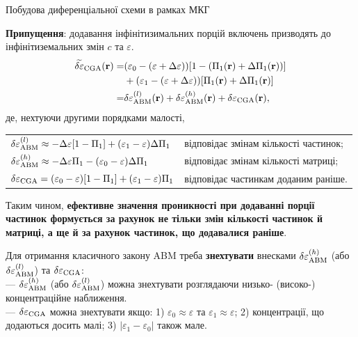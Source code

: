 \documentclass[10pt]{beamer}
\begin{document}
\begin{frame}{Побудова диференціальної схеми в рамках МКГ}
\footnotesize


\textbf{Припущення}: додавання інфінітизимальних порцій включень призводять до інфінітиземальних змін $c$ та $\varepsilon$.
\begin{equation}\label{eq:delta-Brug-diff0}
\begin{split}
  \widetilde{\delta\varepsilon}_{\rm CGA} ({\bf r}) =& (\varepsilon_0 - (\varepsilon + \Delta\varepsilon)) [1 - ({\Pi}_1 ({\bf r}) + \Delta{\Pi}_1 ({\bf r}))]\\
  &+ (\varepsilon_1 - (\varepsilon +   \Delta\varepsilon)) [{\Pi}_1 ({\bf r}) + \Delta{\Pi}_1 ({\bf r})] \\
  =& \delta\varepsilon_{\rm ABM}^{(l)} ({\bf r}) + \delta\varepsilon_{\rm ABM}^{(h)} ({\bf r}) + \delta\varepsilon_{\rm CGA} ({\bf r}),
\end{split}
\end{equation}
де, нехтуючи другими порядками малості,
\begin{tabular}{ ll } 
 $\delta\varepsilon_{\rm ABM}^{(l)} \approx -\Delta\varepsilon [1 - \Pi_1] + (\varepsilon_1 - \varepsilon) \Delta\Pi_1$ & відповідає змінам кількості частинок;\\ 
 $\delta\varepsilon_{\rm ABM}^{(h)} \approx -\Delta\varepsilon \Pi_1 - (\varepsilon_0 - \varepsilon)\Delta\Pi_1$ & відповідає змінам кількості матриці; \\ 
 $\delta\varepsilon_{\rm CGA} = (\varepsilon_0 - \varepsilon)[1 - \Pi_1] + (\varepsilon_1 - \varepsilon)\Pi_1$ & відповідає частинкам доданим раніше.
\end{tabular}

Таким чином, \textbf{ефективне значення проникності при додаванні порції частинок формується за рахунок не тільки змін кількості частинок й матриці, а ще й за рахунок частинок, що додавалися раніше}.

Для отримання класичного закону ABM треба \textbf{знехтувати} внесками $\delta\varepsilon_{\rm ABM}^{(h)}$ (або $\delta\varepsilon_{\rm ABM}^{(l)}$) та $\delta\varepsilon_{\rm CGA}$:\\
--- $\delta\varepsilon_{\rm ABM}^{(h)}$ (або $\delta\varepsilon_{\rm ABM}^{(l)}$) можна знехтувати розглядаючи низько- (високо-) концентраційне наближення.\\
--- {$\delta\varepsilon_{\rm CGA}$ можна знехтувати якщо: 1) $\varepsilon_0 \approx \varepsilon$ та $\varepsilon_1 \approx \varepsilon$; 2) концентрації, що додаються досить малі; 3) $|\varepsilon_1-\varepsilon_0|$ також мале.}
\end{frame}
\end{document}
